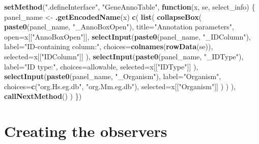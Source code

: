 \documentclass[
]{book}
\newenvironment{Shaded}{\begin{snugshade}}{\end{snugshade}}
\newcommand{\ControlFlowTok}[1]{\textcolor[rgb]{0.13,0.29,0.53}{\textbf{#1}}}
\newcommand{\DataTypeTok}[1]{\textcolor[rgb]{0.13,0.29,0.53}{#1}}
\newcommand{\KeywordTok}[1]{\textcolor[rgb]{0.13,0.29,0.53}{\textbf{#1}}}
\newcommand{\NormalTok}[1]{#1}
\newcommand{\StringTok}[1]{\textcolor[rgb]{0.31,0.60,0.02}{#1}}
\begin{document}
\begin{Shaded}
\begin{Highlighting}[]
\KeywordTok{setMethod}\NormalTok{(}\StringTok{".defineInterface"}\NormalTok{, }\StringTok{"GeneAnnoTable"}\NormalTok{, }\ControlFlowTok{function}\NormalTok{(x, se, select_info) \{}
\NormalTok{    panel_name <-}\StringTok{ }\KeywordTok{.getEncodedName}\NormalTok{(x)}
    \KeywordTok{c}\NormalTok{(}
        \KeywordTok{list}\NormalTok{(}
            \KeywordTok{collapseBox}\NormalTok{(}
                \KeywordTok{paste0}\NormalTok{(panel_name, }\StringTok{"_AnnoBoxOpen"}\NormalTok{),}
                \DataTypeTok{title=}\StringTok{"Annotation parameters"}\NormalTok{,}
                \DataTypeTok{open=}\NormalTok{x[[}\StringTok{"AnnoBoxOpen"}\NormalTok{]],}
                \KeywordTok{selectInput}\NormalTok{(}\KeywordTok{paste0}\NormalTok{(panel_name, }\StringTok{"_IDColumn"}\NormalTok{),}
                    \DataTypeTok{label=}\StringTok{"ID-containing column:"}\NormalTok{,}
                    \DataTypeTok{choices=}\KeywordTok{colnames}\NormalTok{(}\KeywordTok{rowData}\NormalTok{(se)), }
                    \DataTypeTok{selected=}\NormalTok{x[[}\StringTok{"IDColumn"}\NormalTok{]]}
\NormalTok{                ),}
                \KeywordTok{selectInput}\NormalTok{(}\KeywordTok{paste0}\NormalTok{(panel_name, }\StringTok{"_IDType"}\NormalTok{),}
                    \DataTypeTok{label=}\StringTok{"ID type:"}\NormalTok{,}
                    \DataTypeTok{choices=}\NormalTok{allowable,}
                    \DataTypeTok{selected=}\NormalTok{x[[}\StringTok{"IDType"}\NormalTok{]]}
\NormalTok{                ),}
                \KeywordTok{selectInput}\NormalTok{(}\KeywordTok{paste0}\NormalTok{(panel_name, }\StringTok{"_Organism"}\NormalTok{),}
                    \DataTypeTok{label=}\StringTok{"Organism"}\NormalTok{,}
                    \DataTypeTok{choices=}\KeywordTok{c}\NormalTok{(}\StringTok{"org.Hs.eg.db"}\NormalTok{, }\StringTok{"org.Mm.eg.db"}\NormalTok{),}
                    \DataTypeTok{selected=}\NormalTok{x[[}\StringTok{"Organism"}\NormalTok{]]}
\NormalTok{                )}
\NormalTok{            )}
\NormalTok{        ),}
        \KeywordTok{callNextMethod}\NormalTok{()}
\NormalTok{    ) }
\NormalTok{\})}
\end{Highlighting}
\end{Shaded}

\hypertarget{creating-the-observers}{%
\section{Creating the observers}\label{creating-the-observers}}
\end{document}
